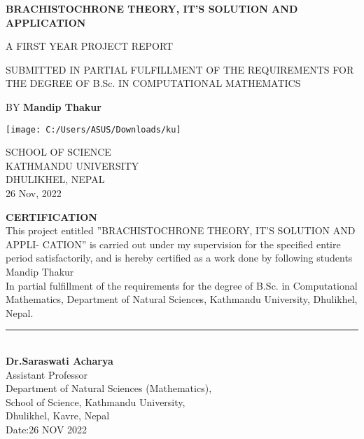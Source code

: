 \documentclass[10pt,a4paper]{article}
\begin{document}
\begin{titlepage}
	\begin{center}
		\vspace*{1cm}
		
		\textbf{BRACHISTOCHRONE THEORY, IT’S SOLUTION AND APPLICATION}
		
		\vspace{1.5 cm}
       A FIRST YEAR PROJECT REPORT
       
       \vspace{1 cm}
       SUBMITTED IN PARTIAL FULFILLMENT OF THE REQUIREMENTS FOR
       THE DEGREE OF B.Sc. IN COMPUTATIONAL MATHEMATICS
		
		\vspace{1cm}
		BY
		\vspace{0.5 cm}		
		\textbf{Mandip Thakur}
		\vspace{1.5 cm}
		
			\texttt{[image: C:/Users/ASUS/Downloads/ku]}
	
	    \vspace{2.5 cm}
	  	SCHOOL OF SCIENCE \\
	    KATHMANDU UNIVERSITY\\
	    DHULIKHEL, NEPAL \\
	    \vspace{1 cm}
	    26 Nov, 2022
	           
		
	   \textbf{CERTIFICATION}
	   \vspace{0.5 cm}
	   	\\ This project entitled ”BRACHISTOCHRONE THEORY, IT’S SOLUTION AND APPLI-
		CATION” is carried out under my supervision for the specified entire period satisfactorily, and is hereby certified as a work done by following students\\
		\vspace{1 cm}
		Mandip Thakur \\
		\vspace{0.5 cm}
		In partial fulfillment of the requirements for the degree of B.Sc. in Computational Mathematics, Department of Natural Sciences, Kathmandu University, Dhulikhel, Nepal.
		
		\vspace{1 cm}
		
		
	\end{center}
     \rule{4 cm}{0.2 pt}
     \vspace{0.1 cm}
     \textbf{\\ Dr.Saraswati Acharya \\}
     \vspace{0.1 cm}
     Assistant Professor \\
     \vspace{0.1 cm}
     Department of Natural Sciences (Mathematics),\\
     \vspace{0.1 cm}
     School of Science, Kathmandu University,\\
     \vspace{0.1 cm}
     Dhulikhel, Kavre, Nepal\\
     \vspace{0.1 cm}
     Date:26 NOV 2022
\end{titlepage}
\end{document}
